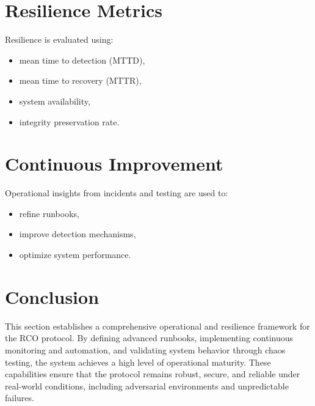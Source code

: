 \section{Resilience Metrics}

Resilience is evaluated using:
\begin{itemize}
\item mean time to detection (MTTD),
\item mean time to recovery (MTTR),
\item system availability,
\item integrity preservation rate.
\end{itemize}

\section{Continuous Improvement}

Operational insights from incidents and testing are used to:
\begin{itemize}
\item refine runbooks,
\item improve detection mechanisms,
\item optimize system performance.
\end{itemize}

\section{Conclusion}

This section establishes a comprehensive operational and resilience framework for the RCO protocol. By defining advanced runbooks, implementing continuous monitoring and automation, and validating system behavior through chaos testing, the system achieves a high level of operational maturity. These capabilities ensure that the protocol remains robust, secure, and reliable under real-world conditions, including adversarial environments and unpredictable failures.